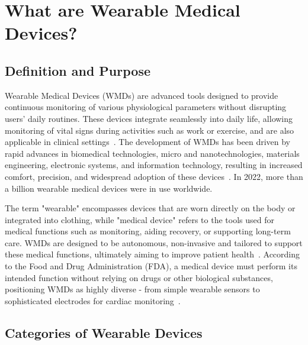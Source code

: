 \documentclass[journal]{IEEEtran}
\begin{document}

\section{What are Wearable Medical Devices?}
\label{2.What_are}
    \subsection{Definition and Purpose}

    Wearable Medical Devices (WMDs) are advanced tools designed to provide continuous monitoring of various physiological parameters without disrupting users' daily routines. These devices integrate seamlessly into daily life, allowing monitoring of vital signs during activities such as work or exercise, and are also applicable in clinical settings~\cite{Fotiadis2006}. The development of WMDs has been driven by rapid advances in biomedical technologies, micro and nanotechnologies, materials engineering, electronic systems, and information technology, resulting in increased comfort, precision, and widespread adoption of these devices~\cite{Degerli2020, Fotiadis2006}. In 2022, more than a billion wearable medical devices were in use worldwide.

    The term "wearable" encompasses devices that are worn directly on the body or integrated into clothing, while "medical device" refers to the tools used for medical functions such as monitoring, aiding recovery, or supporting long-term care. WMDs are designed to be autonomous, non-invasive and tailored to support these medical functions, ultimately aiming to improve patient health~\cite{Degerli2020}. According to the Food and Drug Administration (FDA), a medical device must perform its intended function without relying on drugs or other biological substances, positioning WMDs as highly diverse - from simple wearable sensors to sophisticated electrodes for cardiac monitoring~\cite{Khan2016, Ates2022}.

    \subsection{Categories of Wearable Devices}
    
\end{document}
